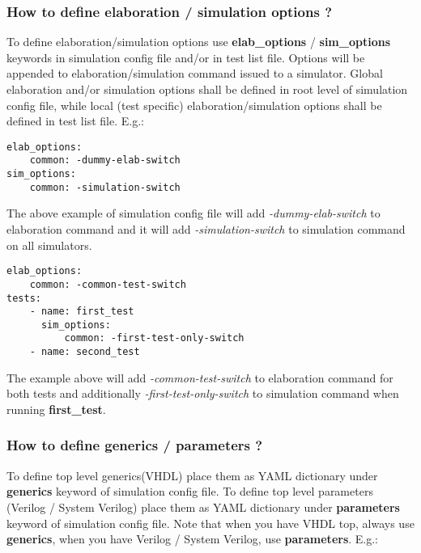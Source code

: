 \documentclass{tropic_design_spec}
\begin{document}
\subsubsection{How to define elaboration / simulation options ?}
\label{sec:how-to-define-elaboration-simulation-options}

To define elaboration/simulation options use \textbf{elab_options} / \textbf{sim_options}
keywords in simulation config file and/or in test list file. Options will
be appended to elaboration/simulation command issued to a simulator. Global elaboration
and/or simulation options shall be defined in root level of simulation config file, while
local (test specific) elaboration/simulation options shall be defined in test list file.
E.g.:

\begin{lstlisting}
elab_options:
    common: -dummy-elab-switch
sim_options:
    common: -simulation-switch
\end{lstlisting}

The above example of simulation config file will add \textit{-dummy-elab-switch} to
elaboration command and it will add \textit{-simulation-switch} to simulation command
on all simulators.

\begin{lstlisting}
elab_options:
    common: -common-test-switch
tests:
    - name: first_test
      sim_options:
          common: -first-test-only-switch
    - name: second_test
\end{lstlisting}

The example above will add \textit{-common-test-switch} to elaboration command for
both tests and additionally \textit{-first-test-only-switch} to simulation command
when running \textbf{first_test}.


\subsubsection{How to define generics / parameters ?}
\label{sec:how-to-define-generics-parameters}

To define top level generics(VHDL) place them as YAML dictionary under \textbf{generics}
keyword of simulation config file. To define top level parameters (Verilog / System Verilog)
place them as YAML dictionary under \textbf{parameters} keyword of simulation config file.
Note that when you have VHDL top, always use \textbf{generics}, when you have Verilog /
System Verilog, use \textbf{parameters}. E.g.:
\end{document}
